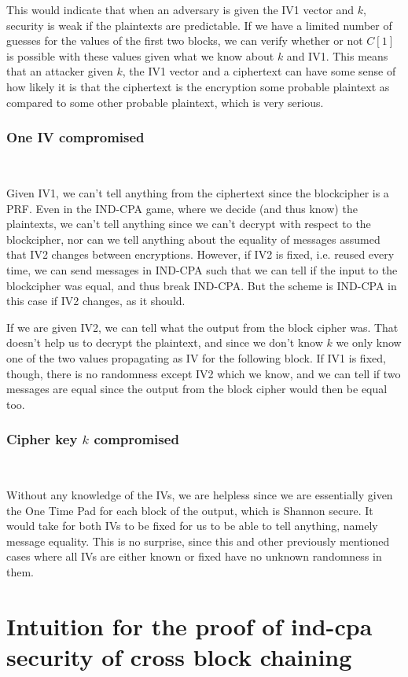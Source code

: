 \documentclass[conference]{IEEEtran}
\begin{document}
This would indicate that when an adversary is given the IV1 vector and $k$, security is weak if the plaintexts are predictable. If we have a limited number of guesses for the values of the first two blocks, we can verify whether or not $C[1]$ is possible with these values given what we know about $k$ and IV1. This means that an attacker given $k$, the IV1 vector and a ciphertext can have some sense of how likely it is that the ciphertext is the encryption some probable plaintext as compared to some other probable plaintext, which is very serious.

\subsubsection{One IV compromised} \

Given IV1, we can't tell anything from the ciphertext since the blockcipher is a PRF. Even in the IND-CPA game, where we decide (and thus know) the plaintexts, we can't tell anything since we can't decrypt with respect to the blockcipher, nor can we tell anything about the equality of messages assumed that IV2 changes between encryptions. However, if IV2 is fixed, i.e. reused every time, we can send messages in IND-CPA such that we can tell if the input to the blockcipher was equal, and thus break IND-CPA. But the scheme is IND-CPA in this case if IV2 changes, as it should. \

If we are given IV2, we can tell what the output from the block cipher was. That doesn't help us to decrypt the plaintext, and since we don't know $k$ we only know one of the two values propagating as IV for the following block. If IV1 is fixed, though, there is no randomness except IV2 which we know, and we can tell if two messages are equal since the output from the block cipher would then be equal too.

\subsubsection{Cipher key $k$ compromised} \

Without any knowledge of the IVs, we are helpless since we are essentially given the One Time Pad for each block of the output, which is Shannon secure. It would take for both IVs to be fixed for us to be able to tell anything, namely message equality. This is no surprise, since this and other previously mentioned cases where all IVs are either known or fixed have no unknown randomness in them.

\section{Intuition for the proof of ind-cpa security of cross block chaining}
\end{document}
